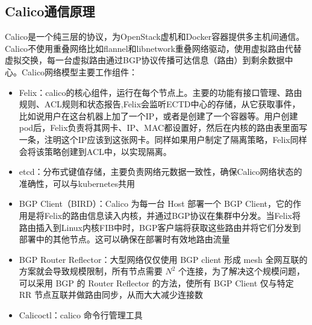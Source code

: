 \documentclass[../../../interview-questions.tex]{subfiles}
\begin{document}
\subsection{Calico通信原理}

Calico是一个纯三层的协议，为OpenStack虚机和Docker容器提供多主机间通信。Calico不使用重叠网络比如flannel和libnetwork重叠网络驱动，使用虚拟路由代替虚拟交换，每一台虚拟路由通过BGP协议传播可达信息（路由）到剩余数据中心。Calico网络模型主要工作组件：

\begin{itemize}
    \item{Felix：calico的核心组件，运行在每个节点上。主要的功能有接口管理、路由规则、ACL规则和状态报告,Felix会监听ECTD中心的存储，从它获取事件，比如说用户在这台机器上加了一个IP，或者是创建了一个容器等。用户创建pod后，Felix负责将其网卡、IP、MAC都设置好，然后在内核的路由表里面写一条，注明这个IP应该到这张网卡。同样如果用户制定了隔离策略，Felix同样会将该策略创建到ACL中，以实现隔离。}
    \item {etcd：分布式键值存储，主要负责网络元数据一致性，确保Calico网络状态的准确性，可以与kubernetes共用}
    \item {BGP Client（BIRD）：Calico 为每一台 Host 部署一个 BGP Client，它的作用是将Felix的路由信息读入内核，并通过BGP协议在集群中分发。当Felix将路由插入到Linux内核FIB中时，BGP客户端将获取这些路由并将它们分发到部署中的其他节点。这可以确保在部署时有效地路由流量}
    \item {BGP Router Reflector：大型网络仅仅使用 BGP client 形成 mesh 全网互联的方案就会导致规模限制，所有节点需要 $N^{2}$ 个连接，为了解决这个规模问题，可以采用 BGP 的 Router Reflector 的方法，使所有 BGP Client 仅与特定 RR 节点互联并做路由同步，从而大大减少连接数}
    \item {Calicoctl：calico 命令行管理工具}
\end{itemize}
\end{document}
